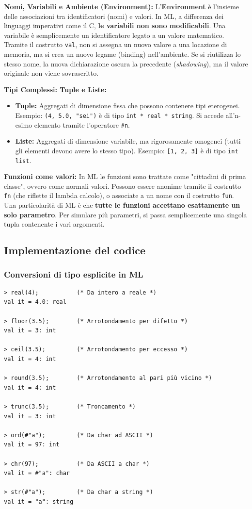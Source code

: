 \documentclass[12pt, a4paper]{article}
\begin{document}
\textbf{Nomi, Variabili e Ambiente (Environment):}
L'\textbf{Environment} è l'insieme delle associazioni tra identificatori (nomi) e valori. In ML, a differenza dei linguaggi imperativi come il C, \textbf{le variabili non sono modificabili}. Una variabile è semplicemente un identificatore legato a un valore matematico.
Tramite il costrutto \texttt{val}, non si assegna un nuovo valore a una locazione di memoria, ma si crea un nuovo legame (binding) nell'ambiente. Se si riutilizza lo stesso nome, la nuova dichiarazione oscura la precedente (\textit{shadowing}), ma il valore originale non viene sovrascritto.

\textbf{Tipi Complessi: Tuple e Liste:}
\begin{itemize}
    \item \textbf{Tuple:} Aggregati di dimensione fissa che possono contenere tipi eterogenei. Esempio: \texttt{(4, 5.0, "sei")} è di tipo \texttt{int * real * string}. Si accede all'n-esimo elemento tramite l'operatore \texttt{\#n}.
    \item \textbf{Liste:} Aggregati di dimensione variabile, ma rigorosamente omogenei (tutti gli elementi devono avere lo stesso tipo). Esempio: \texttt{[1, 2, 3]} è di tipo \texttt{int list}. 
\end{itemize}

\textbf{Funzioni come valori:}
In ML le funzioni sono trattate come "cittadini di prima classe", ovvero come normali valori. Possono essere anonime tramite il costrutto \texttt{fn} (che riflette il lambda calcolo), o associate a un nome con il costrutto \texttt{fun}. Una particolarità di ML è che \textbf{tutte le funzioni accettano esattamente un solo parametro}. Per simulare più parametri, si passa semplicemente una singola tupla contenente i vari argomenti.

\newpage

\subsection{Implementazione del codice}

\subsubsection{Conversioni di tipo esplicite in ML}
\begin{verbatim}
> real(4);           (* Da intero a reale *)
val it = 4.0: real

> floor(3.5);        (* Arrotondamento per difetto *)
val it = 3: int

> ceil(3.5);         (* Arrotondamento per eccesso *)
val it = 4: int

> round(3.5);        (* Arrotondamento al pari più vicino *)
val it = 4: int

> trunc(3.5);        (* Troncamento *)
val it = 3: int

> ord(#"a");         (* Da char ad ASCII *)
val it = 97: int

> chr(97);           (* Da ASCII a char *)
val it = #"a": char

> str(#"a");         (* Da char a string *)
val it = "a": string
\end{verbatim}
\end{document}
